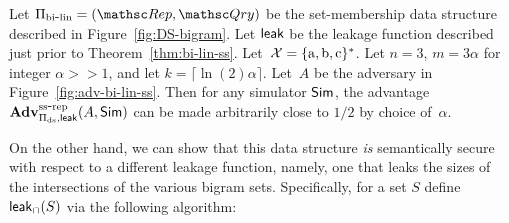\begin{theorem}\label{thm:bi-ds-ss}
Let $\setprim_{\bilin}= (\Rep, \Qry)$ be the set-membership data
structure described in Figure~\ref{fig:DS-bigram}. Let ${\sf leak}$ be
the leakage function described just prior to
Theorem~\ref{thm:bi-lin-ss}. Let~${\cal X}=\{\mathrm{a,b,c}\}^*$. Let
$n=3$,  $m=3\alpha $ for integer $\alpha >> 1$, and let $k = \lceil
\ln(2) \alpha \rceil$.  Let~$A$ be
the adversary in Figure~\ref{fig:adv-bi-lin-ss}.  Then for any
simulator ${\sf Sim}$, the advantage
$\mathrm{\mathbf{Adv}}^{\mathrm{ss\mbox{-}rep}}_{\Pi_{\mathrm{ds}},{\sf leak}}(A,{\sf Sim})$ can be made
arbitrarily close to $1/2$ by choice of~$\alpha$.
\end{theorem}

On the other hand, we can show that this data structure \emph{is}
semantically secure with respect to a different leakage function,
namely, one that leaks the sizes of the intersections of the various
bigram sets. Specifically, for a set $S$ define ${\sf leak}_\cap(S)$
via the following algorithm:

\begin{figure}[h]
\centering
{}
\end{figure}

